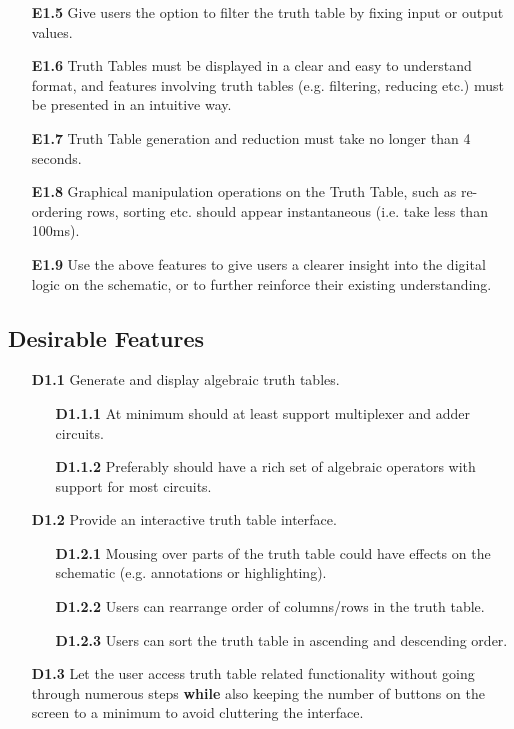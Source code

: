 \begin{itemize}
    \medskip
    \item[\textbf{E1.5}] Give users the option to filter the truth table by fixing input or output values.
    \medskip
    \item[\textbf{\textbf{E1.6}}] Truth Tables must be displayed in a clear and easy to understand format, and features involving truth tables (e.g. filtering, reducing etc.) must be presented in an intuitive way.
    \item[\textbf{\textbf{E1.7}}] Truth Table generation and reduction must take no longer than 4 seconds.
    \item[\textbf{\textbf{E1.8}}] Graphical manipulation operations on the Truth Table, such as re-ordering rows, sorting etc. should appear instantaneous (i.e. take less than 100ms).
    \item[\textbf{E1.9}] Use the above features to give users a clearer insight into the digital logic on the schematic, or to further reinforce their existing understanding.
\end{itemize}

\subsection*{Desirable Features}
\begin{itemize}
    \item[\textbf{D1.1}] Generate and display algebraic truth tables.
    \begin{itemize}
        \item[\textbf{D1.1.1}] At minimum should at least support multiplexer and adder circuits.
        \item[\textbf{D1.1.2}] Preferably should have a rich set of algebraic operators with support for most circuits.
    \end{itemize}
    \medskip
    \item[\textbf{D1.2}] Provide an interactive truth table interface.
    \begin{itemize}
        \item[\textbf{D1.2.1}] Mousing over parts of the truth table could have effects on the schematic (e.g. annotations or highlighting).
        \item[\textbf{D1.2.2}] Users can rearrange order of columns/rows in the truth table.
        \item[\textbf{D1.2.3}] Users can sort the truth table in ascending and descending order.
    \end{itemize}
    \medskip
    \item[\textbf{D1.3}] Let the user access truth table related functionality without going through numerous steps \textbf{while} also keeping the number of buttons on the screen to a minimum to avoid cluttering the interface. 
    \medskip
\end{itemize}

